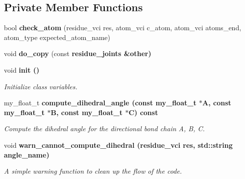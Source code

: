\subsection*{Private Member Functions}
\begin{CompactItemize}
\item 
bool \textbf{check\_\-atom} (residue\_\-vci res, atom\_\-vci c\_\-atom, atom\_\-vci atoms\_\-end, atom\_\-type expected\_\-atom\_\-name)\label{classSimSite3D_1_1residue__joints_50f6fddea71680a7b814c8a1bf81e9c5}

\item 
void \textbf{do\_\-copy} (const \bf{residue\_\-joints} \&other)\label{classSimSite3D_1_1residue__joints_c48e538e71f2124731442e6d045710d5}

\item 
void \bf{init} ()\label{classSimSite3D_1_1residue__joints_8b3d0cf768de75423ff97aefdac11477}

\begin{CompactList}\small\item\em Initialize class variables. \item\end{CompactList}\item 
my\_\-float\_\-t \bf{compute\_\-dihedral\_\-angle} (const my\_\-float\_\-t $\ast$A, const my\_\-float\_\-t $\ast$B, const my\_\-float\_\-t $\ast$C) const 
\begin{CompactList}\small\item\em Compute the dihedral angle for the directional bond chain A, B, C. \item\end{CompactList}\item 
void \bf{warn\_\-cannot\_\-compute\_\-dihedral} (residue\_\-vci res, std::string angle\_\-name)\label{classSimSite3D_1_1residue__joints_49fe835a4836859911cf6ce15b275b51}

\begin{CompactList}\small\item\em A simple warning function to clean up the flow of the code. \item\end{CompactList}\end{CompactItemize}
